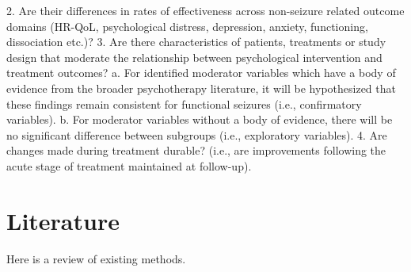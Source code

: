 \documentclass[
  12pt,
  openany]{book}
\begin{document}
2. Are their differences in rates of effectiveness across non-seizure related outcome domains (HR-QoL, psychological distress, depression, anxiety, functioning, dissociation etc.)?
3. Are there characteristics of patients, treatments or study design that moderate the relationship between psychological intervention and treatment outcomes?
a. For identified moderator variables which have a body of evidence from the broader psychotherapy literature, it will be hypothesized that these findings remain consistent for functional seizures (i.e., confirmatory variables).
b. For moderator variables without a body of evidence, there will be no significant difference between subgroups (i.e., exploratory variables).
4. Are changes made during treatment durable? (i.e., are improvements following the acute stage of treatment maintained at follow-up).

\hypertarget{literature}{%
\chapter{Literature}\label{literature}}

Here is a review of existing methods.
\end{document}

